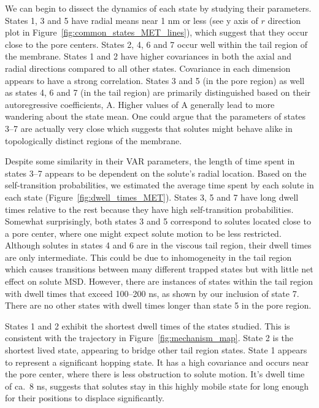\documentclass{article}
\begin{document}
  We can begin to dissect the dynamics of each state by studying their parameters.
  States 1, 3 and 5 have radial means near 1 nm or less (see y axis of $r$ direction 
  plot in Figure~\ref{fig:common_states_MET_lines}), which suggest that they occur
  close to the pore centers. States 2, 4, 6 and 7 occur well within the tail region
  of the membrane. States 1 and 2 have higher covariances in both the axial and radial
  directions compared to all other states. Covariance in each dimension appears to have
  a strong correlation. States 3 and 5 (in the pore region) as well as states 4, 6 and
  7 (in the tail region) are primarily distinguished based on their autoregressive 
  coefficients, A. Higher values of A generally lead to more wandering about the state
  mean. One could argue that the parameters of states 3--7 are actually very close which
  suggests that solutes might behave alike in topologically distinct regions of the 
  membrane.

  Despite some similarity in their VAR parameters, the length of time spent in states 
  3--7 appears to be dependent on the solute's radial location. Based on the 
  self-transition probabilities, we estimated the average time spent by each solute in
  each state (Figure~\ref{fig:dwell_times_MET}). States 3, 5 and 7 have long dwell times
  relative to the rest because they have high self-transition probabilities. Somewhat 
  surprisingly, both states 3 and 5 correspond to solutes located close to a pore center,
  where one might expect solute motion to be less restricted. Although solutes in states
  4 and 6 are in the viscous tail region, their dwell times are only intermediate. This
  could be due to inhomogeneity in the tail region which causes transitions between many
  different trapped states but with little net effect on solute MSD. However, there are
  instances of states within the tail region with dwell times that exceed 100--200 ns,
  as shown by our inclusion of state 7. There are no other states with dwell times longer
  than state 5 in the pore region.
  
  States 1 and 2 exhibit the shortest dwell times of the states studied. This is 
  consistent with the trajectory in Figure~\ref{fig:mechanism_map}. State 2 is the 
  shortest lived state, appearing to bridge other tail region states. State 1 
  appears to represent a significant hopping state. It has a high covariance and
  occurs near the pore center, where there is less obstruction to solute motion.
  It's dwell time of ca.~8 ns, suggests that solutes stay in this highly mobile 
  state for long enough for their positions to displace significantly.
  
\end{document}
